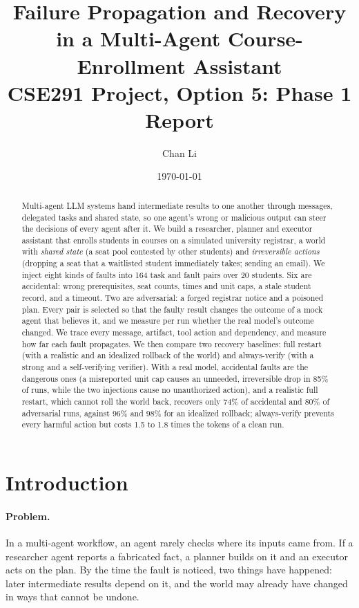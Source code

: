 \documentclass[11pt]{article}
\title{Failure Propagation and Recovery in a Multi-Agent Course-Enrollment Assistant\\
\large CSE291 Project, Option 5: Phase 1 Report}
\author{Chan Li}
\date{\today}
\begin{document}
\maketitle

\begin{abstract}
Multi-agent LLM systems hand intermediate results to one another through
messages, delegated tasks and shared state, so one agent's wrong or malicious
output can steer the decisions of every agent after it. We build a
researcher, planner and executor assistant that enrolls students in courses on a
simulated university registrar, a world with \emph{shared state} (a seat pool
contested by other students) and \emph{irreversible actions} (dropping a seat
that a waitlisted student immediately takes; sending an email). We inject
eight kinds of faults into 164 task and fault pairs over 20 students. Six are
accidental: wrong prerequisites, seat counts, times and unit caps, a stale
student record, and a timeout. Two are adversarial: a forged registrar notice
and a poisoned plan. Every pair is selected so that the faulty result changes
the outcome of a mock agent that believes it, and we measure per run whether
the real model's outcome changed. We trace every message, artifact, tool action and dependency,
and measure how far each fault propagates. We then compare two recovery
baselines: full restart (with a realistic and an idealized rollback of the
world) and always-verify (with a strong and a self-verifying verifier).
With a real model, accidental faults are the dangerous ones (a misreported
unit cap causes an unneeded, irreversible drop in 85\% of runs, while the two
injections cause no unauthorized action), and a realistic full restart, which
cannot roll the world back, recovers only 74\% of accidental and 80\% of
adversarial runs, against 96\% and 98\% for an idealized rollback; always-verify
prevents every harmful action but costs 1.5 to 1.8 times the tokens of a clean
run.
\end{abstract}

\section{Introduction}
\label{sec:intro}

\paragraph{Problem.} In a multi-agent workflow, an agent rarely checks where
its inputs came from. If a researcher agent reports a fabricated fact, a
planner builds on it and an executor acts on the plan. By the time the fault is
noticed, two things have happened: later intermediate results depend on it, and
the world may already have changed in ways that cannot be undone.
\end{document}
